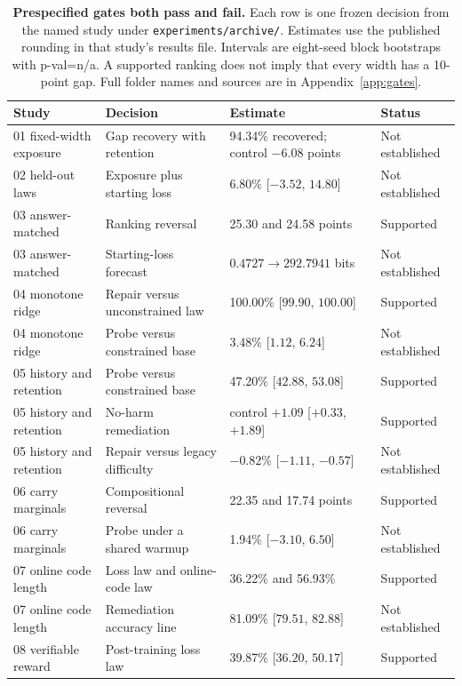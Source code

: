 \begin{table}[t]
\centering
\small
\caption{\textbf{Prespecified gates both pass and fail.} Each row is one frozen decision from the named study under \texttt{experiments/archive/}.
Estimates use the published rounding in that study's results file.
Intervals are eight-seed block bootstraps with p-val=n/a.
A supported ranking does not imply that every width has a 10-point gap.
Full folder names and sources are in Appendix~\ref{app:gates}.}
\label{tab:gates}
\begin{tabular}{@{}p{}p{}p{}p{}@{}}
\toprule
Study & Decision & Estimate & Status \\
\midrule
01 fixed-width exposure & Gap recovery with retention & 94.34\% recovered; control $-6.08$ points & Not established \\
02 held-out laws & Exposure plus starting loss & 6.80\% [$-3.52$, $14.80$] & Not established \\
03 answer-matched & Ranking reversal & 25.30 and 24.58 points & Supported \\
03 answer-matched & Starting-loss forecast & $0.4727 \to 292.7941$ bits & Not established \\
04 monotone ridge & Repair versus unconstrained law & 100.00\% [$99.90$, $100.00$] & Supported \\
04 monotone ridge & Probe versus constrained base & 3.48\% [$1.12$, $6.24$] & Not established \\
05 history and retention & Probe versus constrained base & 47.20\% [$42.88$, $53.08$] & Supported \\
05 history and retention & No-harm remediation & control $+1.09$ [$+0.33$, $+1.89$] & Supported \\
05 history and retention & Repair versus legacy difficulty & $-0.82\%$ [$-1.11$, $-0.57$] & Not established \\
06 carry marginals & Compositional reversal & 22.35 and 17.74 points & Supported \\
06 carry marginals & Probe under a shared warmup & 1.94\% [$-3.10$, $6.50$] & Not established \\
07 online code length & Loss law and online-code law & 36.22\% and 56.93\% & Supported \\
07 online code length & Remediation accuracy line & 81.09\% [$79.51$, $82.88$] & Not established \\
08 verifiable reward & Post-training loss law & 39.87\% [$36.20$, $50.17$] & Supported \\

\end{tabular}
\end{table}

